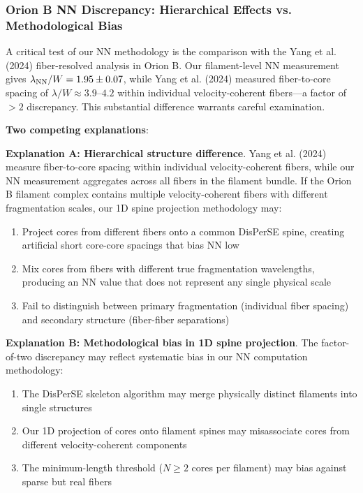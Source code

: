 \documentclass[twoside,twocolumn]{mnras}
\begin{document}
\subsubsection{Orion B NN Discrepancy: Hierarchical Effects vs. Methodological Bias}
\label{sec:orionb_discrepancy}

A critical test of our NN methodology is the comparison with the Yang et al. (2024) fiber-resolved analysis in Orion B. Our filament-level NN measurement gives $\lambda_{\rm NN}/W = 1.95 \pm 0.07$, while Yang et al. (2024) measured fiber-to-core spacing of $\lambda/W \approx 3.9$--$4.2$ within individual velocity-coherent fibers---a factor of $>2$ discrepancy. This substantial difference warrants careful examination.

\textbf{Two competing explanations}:

\noindent\textbf{Explanation A: Hierarchical structure difference}. Yang et al. (2024) measure fiber-to-core spacing within individual velocity-coherent fibers, while our NN measurement aggregates across all fibers in the filament bundle. If the Orion B filament complex contains multiple velocity-coherent fibers with different fragmentation scales, our 1D spine projection methodology may:
\begin{enumerate}
    \item Project cores from different fibers onto a common DisPerSE spine, creating artificial short core-core spacings that bias NN low
    \item Mix cores from fibers with different true fragmentation wavelengths, producing an NN value that does not represent any single physical scale
    \item Fail to distinguish between primary fragmentation (individual fiber spacing) and secondary structure (fiber-fiber separations)
\end{enumerate}

\noindent\textbf{Explanation B: Methodological bias in 1D spine projection}. The factor-of-two discrepancy may reflect systematic bias in our NN computation methodology:
\begin{enumerate}
    \item The DisPerSE skeleton algorithm may merge physically distinct filaments into single structures
    \item Our 1D projection of cores onto filament spines may misassociate cores from different velocity-coherent components
    \item The minimum-length threshold ($N \ge 2$ cores per filament) may bias against sparse but real fibers
\end{enumerate}
\end{document}
